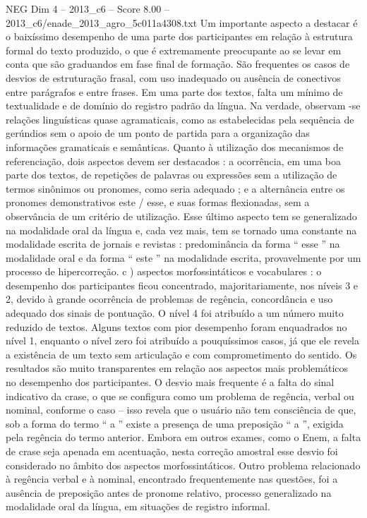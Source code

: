 \begin{textsample}{NEG Dim 4 – 2013\_c6 – Score 8.00 – 2013\_c6/enade\_2013\_agro\_5c011a4308.txt}
Um importante aspecto a destacar é o baixíssimo desempenho de uma parte dos participantes em relação à estrutura formal do texto produzido, o que é extremamente preocupante ao se levar em conta que são graduandos em fase final de formação.
São frequentes os casos de desvios de estruturação frasal, com uso inadequado ou ausência de conectivos entre parágrafos e entre frases.
Em uma parte dos textos, falta um mínimo de textualidade e de domínio do registro padrão da língua.
Na verdade, observam -se relações linguísticas quase agramaticais, como as estabelecidas pela sequência de gerúndios sem o apoio de um ponto de partida para a organização das informações gramaticais e semânticas.
Quanto à utilização dos mecanismos de referenciação, dois aspectos devem ser destacados : a ocorrência, em uma boa parte dos textos, de repetições de palavras ou expressões sem a utilização de termos sinônimos ou pronomes, como seria adequado ; e a alternância entre os pronomes demonstrativos este / esse, e suas formas flexionadas, sem a observância de um critério de utilização.
Esse último aspecto tem se generalizado na modalidade oral da língua e, cada vez mais, tem se tornado uma constante na modalidade escrita de jornais e revistas : predominância da forma “ esse ” na modalidade oral e da forma “ este ” na modalidade escrita, provavelmente por um processo de hipercorreção. c ) aspectos morfossintáticos e vocabulares : o desempenho dos participantes ficou concentrado, majoritariamente, nos níveis 3 e 2, devido à grande ocorrência de problemas de regência, concordância e uso adequado dos sinais de pontuação.
O nível 4 foi atribuído a um número muito reduzido de textos.
Alguns textos com pior desempenho foram enquadrados no nível 1, enquanto o nível zero foi atribuído a pouquíssimos casos, já que ele revela a existência de um texto sem articulação e com comprometimento do sentido.
Os resultados são muito transparentes em relação aos aspectos mais problemáticos no desempenho dos participantes.
O desvio mais frequente é a falta do sinal indicativo da crase, o que se configura como um problema de regência, verbal ou nominal, conforme o caso – isso revela que o usuário não tem consciência de que, sob a forma do termo “ a ” existe a presença de uma preposição “ a ”, exigida pela regência do termo anterior.
Embora em outros exames, como o Enem, a falta de crase seja apenada em acentuação, nesta correção amostral esse desvio foi considerado no âmbito dos aspectos morfossintáticos.
Outro problema relacionado à regência verbal e à nominal, encontrado frequentemente nas questões, foi a ausência de preposição antes de pronome relativo, processo generalizado na modalidade oral da língua, em situações de registro informal.

\end{textsample}
